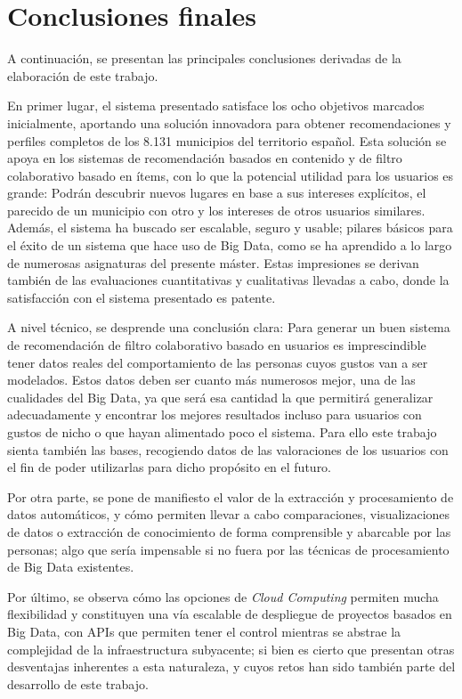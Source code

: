 
\section{Conclusiones finales}

A continuación, se presentan las principales conclusiones derivadas de la elaboración de este trabajo.

En primer lugar, el sistema presentado satisface los ocho objetivos marcados inicialmente, aportando una solución innovadora para obtener recomendaciones y perfiles completos de los 8.131 municipios del territorio español. Esta solución se apoya en los sistemas de recomendación basados en contenido y de filtro colaborativo basado en ítems, con lo que la potencial utilidad para los usuarios es grande: Podrán descubrir nuevos lugares en base a sus intereses explícitos, el parecido de un municipio con otro y los intereses de otros usuarios similares. Además, el sistema ha buscado ser escalable, seguro y usable; pilares básicos para el éxito de un sistema que hace uso de Big Data, como se ha aprendido a lo largo de numerosas asignaturas del presente máster. Estas impresiones se derivan también de las evaluaciones cuantitativas y cualitativas llevadas a cabo, donde la satisfacción con el sistema presentado es patente.

A nivel técnico, se desprende una conclusión clara: Para generar un buen sistema de recomendación de filtro colaborativo basado en usuarios es imprescindible tener datos reales del comportamiento de las personas cuyos gustos van a ser modelados. Estos datos deben ser cuanto más numerosos mejor, una de las cualidades del Big Data, ya que será esa cantidad la que permitirá generalizar adecuadamente y encontrar los mejores resultados incluso para usuarios con gustos de nicho o que hayan alimentado poco el sistema. Para ello este trabajo sienta también las bases, recogiendo datos de las valoraciones de los usuarios con el fin de poder utilizarlas para dicho propósito en el futuro.

Por otra parte, se pone de manifiesto el valor de la extracción y procesamiento de datos automáticos, y cómo permiten llevar a cabo comparaciones, visualizaciones de datos o extracción de conocimiento de forma comprensible y abarcable por las personas; algo que sería impensable si no fuera por las técnicas de procesamiento de Big Data existentes.

Por último, se observa cómo las opciones de \textit{Cloud Computing} permiten mucha flexibilidad y constituyen una vía escalable de despliegue de proyectos basados en Big Data, con APIs que permiten tener el control mientras se abstrae la complejidad de la infraestructura subyacente; si bien es cierto que presentan otras desventajas inherentes a esta naturaleza, y cuyos retos han sido también parte del desarrollo de este trabajo.

